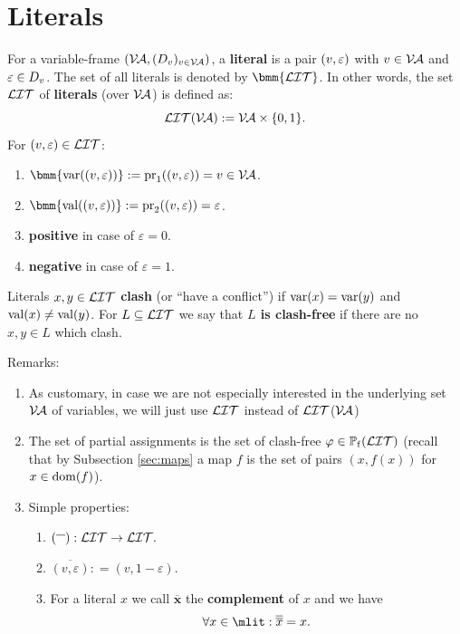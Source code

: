 \documentclass[12pt]{book}
\begin{document}
\section{Literals}
\label{sec:Litsvar}

\begin{defi}\label{def:litdervar}
      For a variable-frame $(\mathcal{V\hspace{-0.1em}A}, (D_v)_{v \in \mathcal{V\hspace{-0.1em}A}})$, a \textbf{literal} is a pair $(v,\varepsilon)$ with $v \in \mathcal{V\hspace{-0.1em}A}$ and $\varepsilon \in D_v$. The set of all literals is denoted by 
	  $\bmm{\Lit}$. In other words, the set $\mathcal{LIT}$ of \textbf{literals} (over $\mathcal{V\hspace{-0.1em}A}$) is defined as:
      $$\mathcal{LIT}( \mathcal{V\hspace{-0.1em}A}): = \mathcal{V\hspace{-0.1em}A} \times \{0,1\}.$$
      For $(v,\varepsilon) \in \mathcal{LIT}$:
      \begin{enumerate}
            \item $\bmm{\var((v,\ve))} := \proj_1((v,\ve)) = v \in \Va$.
            \item $\bmm{\val((v,\ve))} := \proj_2((v,\ve)) = \ve$.
            \item \textbf{positive} in case of $\varepsilon = 0$.
            \item \textbf{negative} in case of $\varepsilon = 1$.
      \end{enumerate}
      Literals $x, y \in \mathcal{LIT}$ \textbf{clash} (or ``have a conflict'') if $\operatorname{var}(x) = \operatorname{var}(y)$ and $\operatorname{val}(x) \ne \operatorname{val}(y)$. For $L \subseteq \mathcal{LIT}$ we say that 
	  \textbf{$L$ is clash-free} if there are no $x, y \in L$ which clash.
\end{defi}
Remarks:
\begin{enumerate}
      \item As customary, in case we are not especially interested in the underlying set   $\mathcal{V\hspace{-0.1em}A}$ of variables, we will just use  $\mathcal{LIT}$ instead of $\mathcal{LIT}$($\mathcal{V\hspace{-0.1em}A}$)
      \item The set of partial assignments is the set of clash-free $\varphi \in \operatorname{\mathbb{P}_f}(\mathcal{LIT})$ (recall that by Subsection \ref{sec:maps} a map $f$ is the set of 
	  pairs $(x,f(x))$ for $x \in \operatorname{dom}(f)$).
      \item Simple properties:
      \begin{enumerate}
            \item $({}^{\overline{~~}}): \mathcal{LIT} \to  \mathcal{LIT}.$
            \item $\overline{(v, \varepsilon)}: = (v, 1-\varepsilon).$
            \item For a literal $x$ we call $\overline{{\bm x}}$ the \textbf{complement} of $x$ and we have
            $$\forall x \in \mlit: \overline{\overline{x}} = x.$$
      \end{enumerate}
\end{enumerate}
\end{document}
